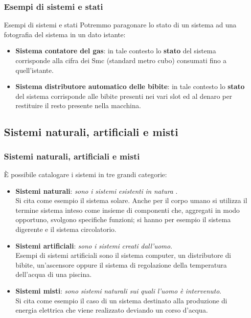 \begin{frame}
	\frametitle{Esempi di sistemi e stati}
	
	\begin{block}{Esempi di sistemi e stati}
		Potremmo paragonare lo stato di un sistema ad una fotografia del sistema in un dato istante:
		\begin{itemize}
			\item \textbf{Sistema contatore del gas}: in tale contesto lo \textbf{stato} del sistema corrisponde alla cifra dei Smc (standard metro cubo) consumati fino a quell'istante.
			\item \textbf{Sistema distributore automatico delle bibite}: in tale contesto lo \textbf{stato} del sistema corrisponde alle bibite presenti nei vari slot ed al denaro per restituire il resto presente nella macchina.
		\end{itemize}
	\end{block}
\end{frame}



\subsection[Sistemi naturali, artificiali e misti]{Sistemi naturali, artificiali e misti}
\begin{frame}
	\frametitle{Sistemi naturali, artificiali e misti}
	
	\begin{block}{È possibile catalogare i sistemi in tre grandi categorie:}
		\begin{itemize}
			\item \textbf{Sistemi naturali}: \textit{sono i sistemi esistenti in natura} .\\
			Si cita come esempio il sistema solare. Anche per il corpo umano si utilizza il termine sistema inteso come insieme di componenti che, aggregati in modo opportuno, svolgono specifiche funzioni; si hanno per esempio il sistema digerente e il sistema circolatorio.
			\item \textbf{Sistemi artificiali}: \textit{sono i sistemi creati dall'uomo}.\\
			Esempi di sistemi artificiali sono il sistema computer, un distributore di bibite, un'ascensore oppure il sistema di regolazione della temperatura dell'acqua di una piscina.
			\item \textbf{Sistemi misti}: \textit{sono sistemi naturali sui quali l’uomo è intervenuto}.\\
			Si cita come esempio il caso di un sistema destinato alla produzione di energia elettrica che viene realizzato deviando un corso d'acqua.
		\end{itemize}
	\end{block}
\end{frame}


